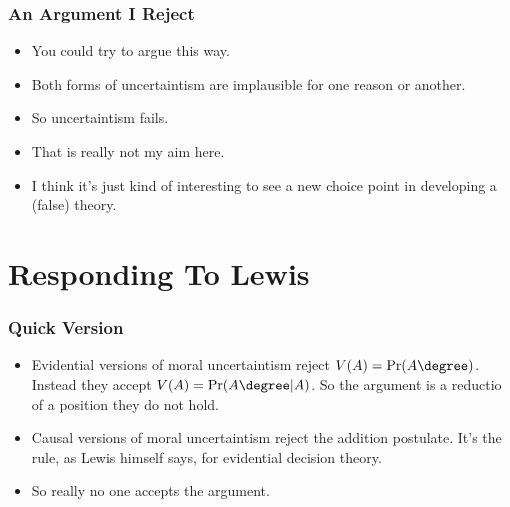 \begin{frame}[fragile]
\frametitle{An Argument I Reject}
\label{anargumentireject}

\begin{itemize}
\item{} You could try to argue this way.

\item{} Both forms of uncertaintism are implausible for one reason or another.

\item{} So uncertaintism fails.

\item{} That is really not my aim here.

\item{} I think it's just kind of interesting to see a new choice point in developing a (false) theory.

\end{itemize}

\end{frame}

\section{Responding To Lewis}
\label{respondingtolewis}

\begin{frame}[fragile]
\frametitle{Quick Version}
\label{quickversion}

\begin{itemize}
\item{} Evidential versions of moral uncertaintism reject $V(A) = \Pr(A\degree)$. Instead they accept $V(A) = \Pr(A\degree | A)$. So the argument is a reductio of a position they do not hold. \pause 

\item{} Causal versions of moral uncertaintism reject the addition postulate. It's the rule, as Lewis himself says, for evidential decision theory. \pause 

\item{} So really no one accepts the argument.

\end{itemize}

\end{frame}

